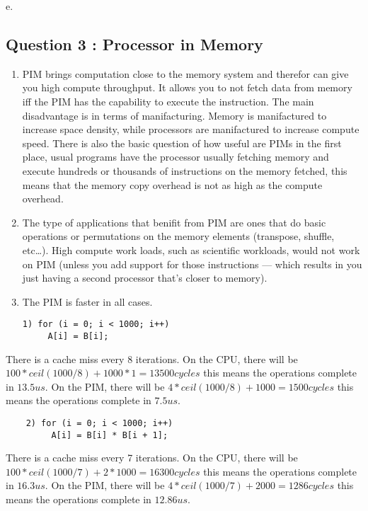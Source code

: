 e.

\subsection{Question 3 : Processor in Memory}

\begin{enumerate}
\def\labelenumi{\alph{enumi}.}
\item
  PIM brings computation close to the memory system and therefor can
  give you high compute throughput. It allows you to not fetch data from
  memory iff the PIM has the capability to execute the instruction. The
  main disadvantage is in terms of manifacturing. Memory is manifactured
  to increase space density, while processors are manifactured to
  increase compute speed. There is also the basic question of how useful
  are PIMs in the first place, usual programs have the processor usually
  fetching memory and execute hundreds or thousands of instructions on
  the memory fetched, this means that the memory copy overhead is not as
  high as the compute overhead.
\item
  The type of applications that benifit from PIM are ones that do basic
  operations or permutations on the memory elements (transpose, shuffle,
  etc\ldots{}). High compute work loads, such as scientific workloads,
  would not work on PIM (unless you add support for those instructions
  --- which results in you just having a second processor that's closer
  to memory).
\item
  The PIM is faster in all cases.

\begin{verbatim}
1) for (i = 0; i < 1000; i++) 
     A[i] = B[i]; 
\end{verbatim}
\end{enumerate}

There is a cache miss every 8 iterations. On the CPU, there will be
$100*ceil(1000/8) + 1000*1 = 13500cycles$ this means the operations
complete in $13.5us$. On the PIM, there will be
$4*ceil(1000/8) + 1000 = 1500cycles$ this means the operations complete
in $7.5us$.

\begin{verbatim}
    2) for (i = 0; i < 1000; i++) 
         A[i] = B[i] * B[i + 1]; 
\end{verbatim}

There is a cache miss every 7 iterations. On the CPU, there will be
$100*ceil(1000/7) + 2*1000 = 16300cycles$ this means the operations
complete in $16.3us$. On the PIM, there will be
$4*ceil(1000/7) + 2000 = 1286cycles$ this means the operations complete
in $12.86us$.


